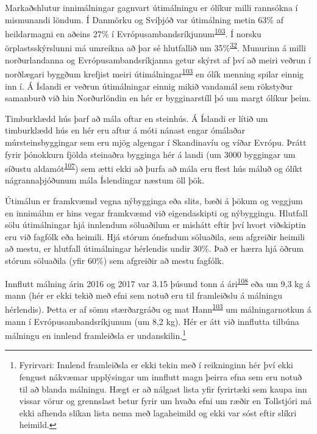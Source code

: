 \documentclass[icelandic,]{book}
\let\rmarkdownfootnote\footnote%
\def\footnote{\protect\rmarkdownfootnote}
\begin{document}
Markaðshlutur innimálningar gagnvart útimálningu er ólíkur milli rannsókna í mismunandi löndum. Í Danmörku og Svíþjóð var útimálning metin 63\% af heildarmagni en aðeins 27\% í Evrópusambandsríkjunum\textsuperscript{\protect\hyperlink{ref-Hann2018}{103}}. Í norsku örplastsskýrslunni má umreikna að þar sé hlutfallið um 35\%\textsuperscript{\protect\hyperlink{ref-sundt2014sources}{32}}. Munurinn á milli norðurlandanna og Evrópusambandsríkjanna getur skýrst af því að meiri veðrun í norðlægari byggðum krefjist meiri útimálningar\textsuperscript{\protect\hyperlink{ref-Hann2018}{103}} en ólík menning spilar einnig inn í. Á Íslandi er veðrun útimálningar einnig mikið vandamál sem rökstyður samanburð við hin Norðurlöndin en hér er bygginarstíll þó um margt ólíkur þeim.

Timburklædd hús þarf að mála oftar en steinhús. Á Íslandi er lítið um timburklædd hús en hér eru aftur á móti nánast engar ómálaðar múrsteinsbyggingar sem eru mjög algengar í Skandinavíu og víðar Evrópu. Þrátt fyrir þónokkurn fjölda steinaðra bygginga hér á landi (um 3000 byggingar um síðustu aldamót\textsuperscript{\protect\hyperlink{ref-Guuxf0mundsson2003}{107}}) sem ætti ekki að þurfa að mála eru flest hús máluð og ólíkt nágrannaþjóðunum mála Íslendingar næstum öll þök.

Útimálun er framkvæmd vegna nýbygginga eða slits, bæði á þökum og veggjum en innimálun er hins vegar framkvæmd við eigendaskipti og nýbyggingu. Hlutfall sölu útimálningar hjá innlendum söluaðilum er mishátt eftir því hvort viðskiptin eru við fagfólk eða heimili. Hjá stórum ónefndum söluaðila, sem afgreiðir heimili að mestu, er hlutfall útimálningar hérlendis undir 30\%. Það er hærra hjá öðrum stórum söluaðila (yfir 60\%) sem afgreiðir að mestu fagfólk.

Innflutt málning árin 2016 og 2017 var 3.15 þúsund tonn á ári\textsuperscript{\protect\hyperlink{ref-tollur2017}{108}} eða um 9,3 kg á mann (hér er ekki tekið með efni sem notuð eru til framleiðslu á málningu hérlendis). Þetta er af sömu stærðargráðu og mat Hann\textsuperscript{\protect\hyperlink{ref-Hann2018}{103}} um málningarnotkun á mann í Evrópusambandsríkjunum (um 8,2 kg). Hér er átt við innflutta tilbúna málningu en innlend framleiðsla er undanskilin.\footnote{Fyrirvari: Innlend framleiðsla er ekki tekin með í reikninginn hér því ekki fengust nákvæmar upplýsingar um innflutt magn þeirra efna sem eru notuð til að blanda málningu. Hægt er að nálgast lista yfir fyrirtæki sem kaupa inn vissar vörur og grennslast betur fyrir um hvaða efni um ræðir en Tollstjóri má ekki afhenda slíkan lista nema með lagaheimild og ekki var sóst eftir slíkri heimild.}
\end{document}
